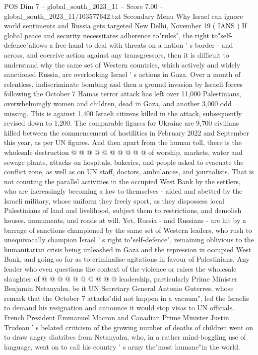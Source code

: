 \begin{textsample}{POS Dim 7 – global\_south\_2023\_11 – Score 7.00 – global\_south\_2023\_11/103577642.txt}  \label{ex:f7_pos_301}
Secondary Menu Why Israel can ignore world sentiments and Russia gets targeted New Delhi, November 19 ( IANS ) If global peace and security necessitates adherence to"rules", the right to"self-defence"allows a free hand to deal with threats on a nation ' s border - and across, and coercive action against any transgressors, then it is difficult to understand why the same set of Western countries, which actively and widely sanctioned Russia, are overlooking Israel ' s actions in Gaza.
Over a month of relentless, indiscriminate bombing and then a ground invasion by Israeli forces following the October 7 Hamas terror attack has left over 11,000 Palestinians, overwhelmingly women and children, dead in Gaza, and another 3,000 odd missing.
This is against 1,400 Israeli citizens killed in the attack, subsequently revised down to 1,200.
The comparable figures for Ukraine are 9,700 civilians killed between the commencement of hostilities in February 2022 and September this year, as per UN figures.
And then apart from the human toll, there is the wholesale destruction @ @ @ @ @ @ @ @ @ @ of worship, markets, water and sewage plants, attacks on hospitals, bakeries, and people asked to evacuate the conflict zone, as well as on UN staff, doctors, ambulances, and journalists.
That is not counting the parallel activities in the occupied West Bank by the settlers, who are increasingly becoming a law to themselves - aided and abetted by the Israeli military, whose uniform they freely sport, as they dispossess local Palestinians of land and livelihood, subject them to restrictions, and demolish houses, monuments, and roads at will.
Yet, Russia - and Russians - are hit by a barrage of sanctions championed by the same set of Western leaders, who rush to unequivocally champion Israel ' s right to"self-defence", remaining oblivious to the humanitarian crisis being unleashed in Gaza and the repression in occupied West Bank, and going so far as to criminalise agitations in favour of Palestinians.
Any leader who even questions the context of the violence or raises the wholesale slaughter of @ @ @ @ @ @ @ @ @ @ leadership, particularly Prime Minister Benjamin Netanyahu, be it UN Secretary General Antonio Guterres, whose remark that the October 7 attacks"did not happen in a vacuum", led the Israelis to demand his resignation and announce it would stop visas to UN officials.
French President Emmanuel Macron and Canadian Prime Minister Justin Trudeau ' s belated criticism of the growing number of deaths of children went on to draw angry diatribes from Netanyahu, who, in a rather mind-boggling use of language, went on to call his country ' s army the"most humane"in the world.

\end{textsample}
